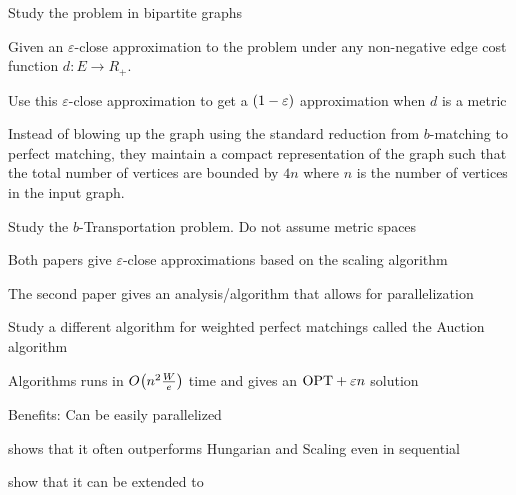 \begin{desclist}
    \item Study the \minpbmatch{} problem in bipartite graphs 
    \item Given an $\varepsilon$-close approximation to the problem under any non-negative edge cost function $d \colon E \to R_+$. 
    \item Use this $\varepsilon$-close approximation to get a $\left( 1-\varepsilon \right)$ approximation when $d$ is a metric
    \item Instead of blowing up the graph using the standard reduction from $b$-matching to perfect matching, they maintain a compact representation of the graph such that the total number of vertices are bounded by $4n$
          where $n$ is the number of vertices in the input graph. 
\end{desclist}

\begin{desclist}
    \item Study the $b$-\textsf{Transportation} problem. Do not assume metric spaces
    \item Both papers give $\varepsilon$-close approximations based on the scaling algorithm
    \item The second paper gives an analysis/algorithm that allows for parallelization
\end{desclist}

\begin{desclist}
    \item Study a different algorithm for weighted perfect matchings called the \textsf{Auction} algorithm 
    \item Algorithms runs in $O_{} \! \left( n^2\frac{W}{e} \right)$ time and gives an $\mathrm{OPT} + \varepsilon n$ solution
    \item Benefits: Can be easily parallelized
    \item \cite{alfaro2022assignment} shows that it often outperforms Hungarian and Scaling even in sequential
    \item \cite{bertsekas1989auction} show that it can be extended to \minpbmatch{} 
\end{desclist}

